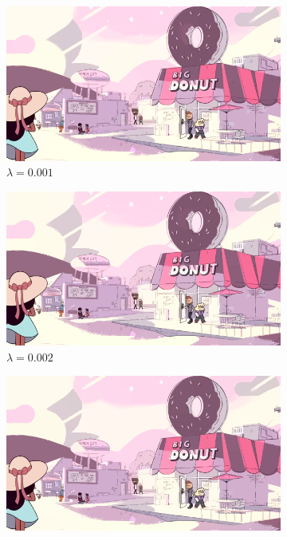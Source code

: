 \documentclass[10pt,twocolumn,letterpaper]{article}
\begin{document}
\begin{figure}
\centering
\begin{subfigure}{.48\linewidth}
\includegraphics[width=\linewidth]{gradminResults/gradmin_1.png}
\caption{$\lambda = 0.001$}
\end{subfigure}
\begin{subfigure}{.48\linewidth}
\includegraphics[width=\linewidth]{gradminResults/gradmin_2.png}
\caption{$\lambda = 0.002$}
\end{subfigure}
\begin{subfigure}{.48\linewidth}
\includegraphics[width=\linewidth]{gradminResults/gradmin_4.png}

\end{subfigure}
\end{figure}
\end{document}
